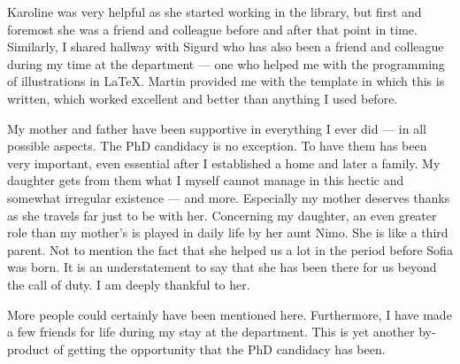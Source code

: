 Karoline was very helpful as she started working in the library, but first and foremost she was a friend and colleague before and after that point in time. Similarly, I shared hallway with Sigurd who has also been a friend and colleague during my time at the department --- one who helped me with the programming of illustrations in LaTeX. Martin provided me with the template in which this is written, which worked excellent and better than anything I used before.

My mother and father have been supportive in everything I ever did --- in all possible aspects. The PhD candidacy is no exception. To have them has been very important, even essential after I established a home and later a family. My daughter gets from them what I myself cannot manage in this hectic and somewhat irregular existence --- and more. Especially my mother deserves thanks as she travels far just to be with her. Concerning my daughter, an even greater role than my mother's is played in daily life by her aunt Nimo. She is like a third parent. Not to mention the fact that she helped us a lot in the period before Sofia was born. It is an understatement to say that she has been there for us beyond the call of duty. I am deeply thankful to her.

More people could certainly have been mentioned here. Furthermore, I have made a few friends for life during my stay at the department. This is yet another by-product of getting the opportunity that the PhD candidacy has been.

